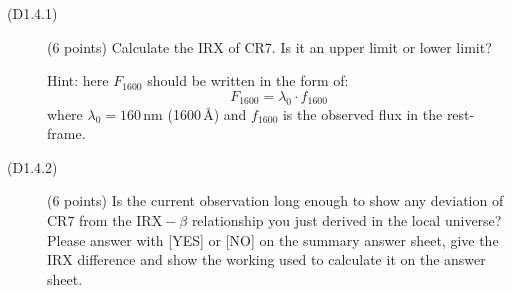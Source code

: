 \begin{description}
\item[(D1.4.1)] (6 points) Calculate the IRX of CR7. Is it an upper limit or
  lower limit?

  Hint: here $F_{1600}$ should be written in the form of:
  \[ F_{1600} = \lambda_0 \cdot f_{1600} \]
  where $\lambda_0 = 160$\,nm (1600\,\AA) and $f_{1600}$ is the observed flux
  in the rest-frame.
\item[(D1.4.2)] (6 points) Is the current observation long enough to show any
  deviation of CR7 from the $\mathrm{IRX}-\beta$ relationship you just derived
  in the local universe? Please answer with [YES] or [NO] on the summary
  answer sheet, give the IRX difference and show the working used to calculate
  it on the answer sheet.
\end{description}
